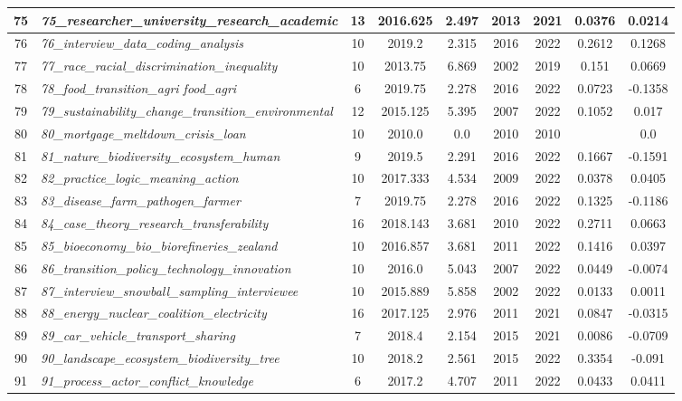 \documentclass[12pt]{article}
\begin{document}
\begin{landscape}
\begin{scriptsize}
\begin{longtable}{|>{\scriptsize}c|p{6cm}|c|c|c|c|c|c|c|}
75 & \textit{75\_researcher\_university\_research\_academic} & 13 & 2016.625 & 2.497 & 2013 & 2021 & 0.0376 & 0.0214 \\ \hline
76 & \textit{76\_interview\_data\_coding\_analysis} & 10 & 2019.2 & 2.315 & 2016 & 2022 & 0.2612 & 0.1268 \\ \hline
77 & \textit{77\_race\_racial\_discrimination\_inequality} & 10 & 2013.75 & 6.869 & 2002 & 2019 & 0.151 & 0.0669 \\ \hline
78 & \textit{78\_food\_transition\_agri food\_agri} & 6 & 2019.75 & 2.278 & 2016 & 2022 & 0.0723 & -0.1358 \\ \hline
79 & \textit{79\_sustainability\_change\_transition\_environmental} & 12 & 2015.125 & 5.395 & 2007 & 2022 & 0.1052 & 0.017 \\ \hline
80 & \textit{80\_mortgage\_meltdown\_crisis\_loan} & 10 & 2010.0 & 0.0 & 2010 & 2010 &  & 0.0 \\ \hline
81 & \textit{81\_nature\_biodiversity\_ecosystem\_human} & 9 & 2019.5 & 2.291 & 2016 & 2022 & 0.1667 & -0.1591 \\ \hline
82 & \textit{82\_practice\_logic\_meaning\_action} & 10 & 2017.333 & 4.534 & 2009 & 2022 & 0.0378 & 0.0405 \\ \hline
83 & \textit{83\_disease\_farm\_pathogen\_farmer} & 7 & 2019.75 & 2.278 & 2016 & 2022 & 0.1325 & -0.1186 \\ \hline
84 & \textit{84\_case\_theory\_research\_transferability} & 16 & 2018.143 & 3.681 & 2010 & 2022 & 0.2711 & 0.0663 \\ \hline
85 & \textit{85\_bioeconomy\_bio\_biorefineries\_zealand} & 10 & 2016.857 & 3.681 & 2011 & 2022 & 0.1416 & 0.0397 \\ \hline
86 & \textit{86\_transition\_policy\_technology\_innovation} & 10 & 2016.0 & 5.043 & 2007 & 2022 & 0.0449 & -0.0074 \\ \hline
87 & \textit{87\_interview\_snowball\_sampling\_interviewee} & 10 & 2015.889 & 5.858 & 2002 & 2022 & 0.0133 & 0.0011 \\ \hline
88 & \textit{88\_energy\_nuclear\_coalition\_electricity} & 16 & 2017.125 & 2.976 & 2011 & 2021 & 0.0847 & -0.0315 \\ \hline
89 & \textit{89\_car\_vehicle\_transport\_sharing} & 7 & 2018.4 & 2.154 & 2015 & 2021 & 0.0086 & -0.0709 \\ \hline
90 & \textit{90\_landscape\_ecosystem\_biodiversity\_tree} & 10 & 2018.2 & 2.561 & 2015 & 2022 & 0.3354 & -0.091 \\ \hline
91 & \textit{91\_process\_actor\_conflict\_knowledge} & 6 & 2017.2 & 4.707 & 2011 & 2022 & 0.0433 & 0.0411 \\ \hline

\end{longtable}
\end{scriptsize}
\end{landscape}
\end{document}
